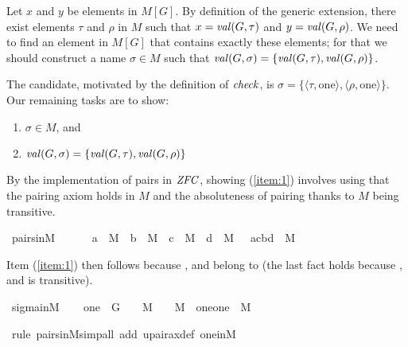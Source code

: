Let $x$ and $y$ be elements in $M[G]$. By definition of the generic extension, there exist
elements $\tau$ and $\rho$ in $M$ such that $x = \operatorname{\mathit{val}}(G,\tau)$ and
$y = \operatorname{\mathit{val}}(G,\rho)$.  We need to find an element in $M[G]$ that contains exactly
these elements; for that we should construct a name $\sigma\in M$ such that
$\operatorname{\mathit{val}}(G,\sigma) = \{ \operatorname{\mathit{val}}(G,\tau) , \operatorname{\mathit{val}}(G,\rho) \}$. 

The candidate, motivated by the definition of $\operatorname{\mathit{check}}$,  is
$\sigma = \{\langle \tau , \mathrm{one} \rangle , \langle \rho , \mathrm{one} \rangle \}$. 
Our remaining tasks are to show:
\begin{enumerate}
  \item \label{item:1}$\sigma \in M$, and
  \item \label{item:2} $\operatorname{\mathit{val}}(G,\sigma) = \{ \operatorname{\mathit{val}}(G,\tau) , \operatorname{\mathit{val}}(G,\rho) \}$
\end{enumerate}

By the implementation of pairs  in $\mathit{ZFC}$, showing (\ref{item:1})
involves using that the
pairing axiom holds in $M$ and the absoluteness of pairing
thanks to $M$ being transitive. 

\begin{isabelle}
\isamarkupfalse%
\ pairs{\isacharunderscore}in{\isacharunderscore}M\ {\isacharcolon}\ \isanewline
\ \ {\isachardoublequoteopen}\ {\isasymlbrakk}\ a\ {\isasymin}\ M\ {\isacharsemicolon}\ b\ {\isasymin}\ M\ {\isacharsemicolon}\ c\ {\isasymin}\ M\ {\isacharsemicolon}\ d\ {\isasymin}\ M\ {\isasymrbrakk}\ {\isasymLongrightarrow}\ {\isacharbraceleft}{\isasymlangle}a{\isacharcomma}c{\isasymrangle}{\isacharcomma}{\isasymlangle}b{\isacharcomma}d{\isasymrangle}{\isacharbraceright}\ {\isasymin}\ M{\isachardoublequoteclose}
\end{isabelle}

Item (\ref{item:1}) then follows because \isa{\isasymtau}, \isa{\isasymrho} and
 belong to  (the last fact holds because ,  and
 is transitive).

\begin{isabelle}
\isamarkupfalse%
\ sigma{\isacharunderscore}in{\isacharunderscore}M\ {\isacharcolon}\isanewline
\ \ {\isachardoublequoteopen} one\ {\isasymin}\ G\ {\isasymLongrightarrow}\ {\isasymtau}\ {\isasymin}\ M\ {\isasymLongrightarrow}\ {\isasymrho}\ {\isasymin}\ M\ {\isasymLongrightarrow}\ {\isacharbraceleft}{\isasymlangle}{\isasymtau}{\isacharcomma}one{\isasymrangle}{\isacharcomma}{\isasymlangle}{\isasymrho}{\isacharcomma}one{\isasymrangle}{\isacharbraceright}\ {\isasymin}\ M{\isachardoublequoteclose}

\isamarkupfalse%
\ {\isacharparenleft}rule\ pairs{\isacharunderscore}in{\isacharunderscore}M{\isacharcomma}simp{\isacharunderscore}all\ add{\isacharcolon}\ upair{\isacharunderscore}ax{\isacharunderscore}def\ one{\isacharunderscore}in{\isacharunderscore}M{\isacharparenright}%
\end{isabelle}

